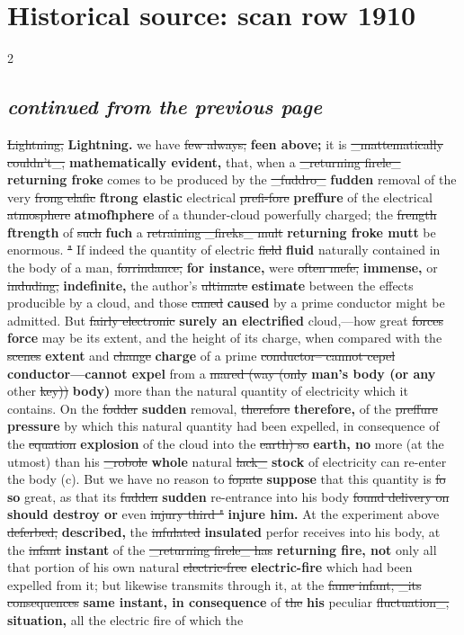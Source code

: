 \documentclass[10pt]{article}
\begin{document}
\section*{Historical source: scan row 1910}
\begin{multicols}{2}
\subsection*{\textit{continued from the previous page}}
\sout{Lightning,} \textbf{Lightning.} we have \sout{few always;} \textbf{feen above;} it is \sout{\_mattematically couldn’t\_,} \textbf{mathematically evident,} that, when a \sout{\_returning firele\_} \textbf{returning froke} comes to be produced by the \sout{\_fuddro\_} \textbf{fudden} removal of the very \sout{frong elafic} \textbf{ftrong elastic} electrical \sout{prefi-fore} \textbf{preffure} of the electrical \sout{atmosphere} \textbf{atmofhphere} of a thunder-cloud powerfully charged; the \sout{frength} \textbf{ftrength} of \sout{such} \textbf{fuch} a \sout{retraining \_fireks\_ mult} \textbf{returning froke mutt} be enormous. \sout{"} If indeed the quantity of electric \sout{field} \textbf{fluid} naturally contained in the body of a man, \sout{forrindance,} \textbf{for instance,} were \sout{often mefe,} \textbf{immense,} or \sout{induding,} \textbf{indefinite,} the author's \sout{ultimate} \textbf{estimate} between the effects producible by a cloud, and those \sout{caned} \textbf{caused} by a prime conductor might be admitted. But \sout{fairly electronic} \textbf{surely an electrified} cloud,—how great \sout{forces} \textbf{force} may be its extent, and the height of its charge, when compared with the \sout{scenes} \textbf{extent} and \sout{change} \textbf{charge} of a prime \sout{conductor-- cannot cepel} \textbf{conductor—cannot expel} from a \sout{mared (way (only} \textbf{man's body (or any} other \sout{key))} \textbf{body)} more than the natural quantity of electricity which it contains. On the \sout{fodder} \textbf{sudden} removal, \sout{therefore} \textbf{therefore,} of the \sout{preffure} \textbf{pressure} by which this natural quantity had been expelled, in consequence of the \sout{equation} \textbf{explosion} of the cloud into the \sout{earth) so} \textbf{earth, no} more (at the utmost) than his \sout{\_robole} \textbf{whole} natural \sout{lack\_} \textbf{stock} of electricity can re-enter the body (c). But we have no reason to \sout{fopate} \textbf{suppose} that this quantity is \sout{fo} \textbf{so} great, as that its \sout{fudden} \textbf{sudden} re-entrance into his body \sout{found delivery on} \textbf{should destroy or} even \sout{injury third "} \textbf{injure him.} At the experiment above \sout{deferbed,} \textbf{described,} the \sout{infulated} \textbf{insulated} perfor receives into his body, at the \sout{infant} \textbf{instant} of the \sout{\_returning firele\_ has} \textbf{returning fire, not} only all that portion of his own natural \sout{electric-free} \textbf{electric-fire} which had been expelled from it; but likewise transmits through it, at the \sout{fame infant, \_its consequences} \textbf{same instant, in consequence} of \sout{the} \textbf{his} peculiar \sout{fluctuation\_,} \textbf{situation,} all the electric fire of which the 
\end{multicols}
\end{document}
